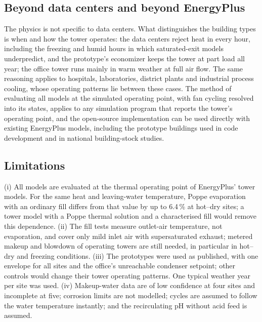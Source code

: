 \documentclass[preprint,12pt]{elsarticle}
\begin{document}
\subsection{Beyond data centers and beyond EnergyPlus}
The physics is not specific to data centers. What distinguishes the building types is when and how the tower operates:
the data centers reject heat in every hour, including the freezing and humid hours in which saturated-exit models
underpredict, and the prototype's economizer keeps the tower at part load all year; the office tower runs mainly in warm
weather at full air flow. The same reasoning applies to hospitals, laboratories, district plants and industrial process
cooling, whose operating patterns lie between these cases. The method of evaluating all models at the simulated operating
point, with fan cycling resolved into its states, applies to any simulation program that reports the tower's operating
point, and the open-source implementation can be used directly with existing EnergyPlus models, including the prototype
buildings used in code development and in national building-stock studies.

\subsection{Limitations}
(i) All models are evaluated at the thermal operating point of EnergyPlus' tower models. For the same heat and
leaving-water temperature, Poppe evaporation with an ordinary fill differs from that value by up to 6.4\,\% at hot--dry
sites; a tower model with a Poppe thermal solution and a characterised fill would remove this dependence. (ii) The fill
tests measure outlet-air temperature, not evaporation, and cover only mild inlet air with supersaturated exhaust; metered
makeup and blowdown of operating towers are still needed, in particular in hot--dry and freezing conditions. (iii) The
prototypes were used as published, with one envelope for all sites and the office's unreachable condenser setpoint; other
controls would change their tower operating patterns. One typical weather year per site was used. (iv) Makeup-water data
are of low confidence at four sites and incomplete at five; corrosion limits are not modelled; cycles are assumed to follow
the water temperature instantly; and the recirculating pH without acid feed is assumed.

\end{document}
